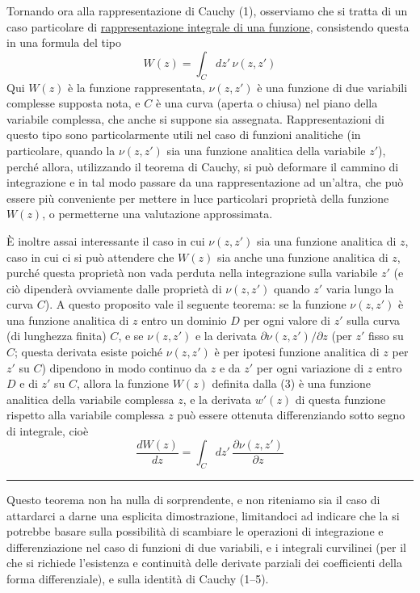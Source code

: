 \documentclass[11pt, a4paper]{book}
\numberwithin{equation}{section}
\begin{document}
Tornando ora alla rappresentazione di Cauchy (1), osserviamo che si tratta di un caso particolare di \underline{rappresentazione integrale di una funzione}, consistendo questa in una formula del tipo
\begin{equation}
W(z) = \int_C dz'\, \nu(z, z') \tag{3}
\end{equation}
Qui $W(z)$ è la funzione rappresentata, $\nu(z, z')$ è una funzione di due variabili complesse supposta nota, e $C$ è una curva (aperta o chiusa) nel piano della variabile complessa, che anche si suppone sia assegnata. Rappresentazioni di questo tipo sono particolarmente utili nel caso di funzioni analitiche (in particolare, quando la $\nu(z, z')$ sia una funzione analitica della variabile $z'$), perché allora, utilizzando il teorema di Cauchy, si può deformare il cammino di integrazione e in tal modo passare da una rappresentazione ad un'altra, che può essere più conveniente per mettere in luce particolari proprietà della funzione $W(z)$, o permetterne una valutazione approssimata.

È inoltre assai interessante il caso in cui $\nu(z, z')$ sia una funzione analitica di $z$, caso in cui ci si può attendere che $W(z)$ sia anche una funzione analitica di $z$, purché questa proprietà non vada perduta nella integrazione sulla variabile $z'$ (e ciò dipenderà ovviamente dalle proprietà di $\nu(z, z')$ quando $z'$ varia lungo la curva $C$). A questo proposito vale il seguente teorema: se la funzione $\nu(z, z')$ è una funzione analitica di $z$ entro un dominio $D$ per ogni valore di $z'$ sulla curva (di lunghezza finita) $C$, e se $\nu(z, z')$ e la derivata $\partial\nu(z,z')/\partial z$ (per $z'$ fisso su $C$; questa derivata esiste poiché $\nu(z,z')$ è per ipotesi funzione analitica di $z$ per $z'$ su $C$) dipendono in modo continuo da $z$ e da $z'$ per ogni variazione di $z$ entro $D$ e di $z'$ su $C$, allora la funzione $W(z)$ definita dalla (3) è una funzione analitica della variabile complessa $z$, e la derivata $w'(z)$ di questa funzione rispetto alla variabile complessa $z$ può essere ottenuta differenziando sotto segno di integrale, cioè
\begin{equation}
\frac{dW(z)}{dz} = \int_C dz'\, \frac{\partial\nu(z,z')}{\partial z} \tag{4}
\end{equation}

\medskip\hrule\medskip

Questo teorema non ha nulla di sorprendente, e non riteniamo sia il caso di attardarci a darne una esplicita dimostrazione, limitandoci ad indicare che la si potrebbe basare sulla possibilità di scambiare le operazioni di integrazione e differenziazione nel caso di funzioni di due variabili, e i integrali curvilinei (per il che si richiede l'esistenza e continuità delle derivate parziali dei coefficienti della forma differenziale), e sulla identità di Cauchy (1--5).
\end{document}
